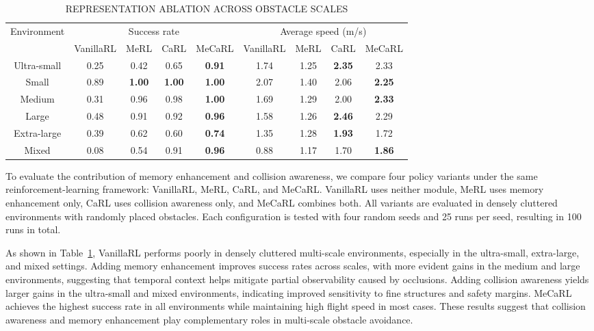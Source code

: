 \documentclass[letterpaper, 10 pt, conference]{ieeeconf}  %
\begin{document}
\begin{table}[t]
  \centering
  \caption{REPRESENTATION ABLATION ACROSS OBSTACLE SCALES}
  \label{tab:repr_eval}
  \small
  \setlength{\tabcolsep}{5pt}
  \renewcommand{\arraystretch}{1.15}
  \begin{tabular}{c cccc cccc}
    \toprule
    \multirow{2}{*}{Environment} &
    \multicolumn{4}{c}{Success rate} &
    \multicolumn{4}{c}{Average speed (m/s)} \\
    \cmidrule(lr){2-5}\cmidrule(lr){6-9}
    & VanillaRL & MeRL & CaRL & MeCaRL
    & VanillaRL & MeRL & CaRL & MeCaRL \\
    \midrule
    Ultra-small & 0.25 & 0.42 & 0.65 & \textbf{0.91} & 1.74 & 1.25 & \textbf{2.35} & 2.33 \\
    Small       & 0.89 & \textbf{1.00} & \textbf{1.00} & \textbf{1.00} & 2.07 & 1.40 & 2.06 & \textbf{2.25} \\
    Medium      & 0.31 & 0.96 & 0.98 & \textbf{1.00} & 1.69 & 1.29 & 2.00 & \textbf{2.33} \\
    Large       & 0.48 & 0.91 & 0.92 & \textbf{0.96} & 1.58 & 1.26 & \textbf{2.46} & 2.29 \\
    Extra-large & 0.39 & 0.62 & 0.60 & \textbf{0.74} & 1.35 & 1.28 & \textbf{1.93} & 1.72 \\
    Mixed       & 0.08 & 0.54 & 0.91 & \textbf{0.96} & 0.88 & 1.17 & 1.70 & \textbf{1.86} \\
    \bottomrule
  \end{tabular}
\end{table}

To evaluate the contribution of memory enhancement and collision awareness, we compare four policy variants under the same reinforcement-learning framework: VanillaRL, MeRL, CaRL, and MeCaRL. 
VanillaRL uses neither module, MeRL uses memory enhancement only, CaRL uses collision awareness only, and MeCaRL combines both. 
All variants are evaluated in densely cluttered environments with randomly placed obstacles. Each configuration is tested with four random seeds and 25 runs per seed, resulting in 100 runs in total.

As shown in Table~\ref{tab:repr_eval}, VanillaRL performs poorly in densely cluttered multi-scale environments, especially in the ultra-small, extra-large, and mixed settings. 
Adding memory enhancement improves success rates across scales, with more evident gains in the medium and large environments, suggesting that temporal context helps mitigate partial observability caused by occlusions. 
Adding collision awareness yields larger gains in the ultra-small and mixed environments, indicating improved sensitivity to fine structures and safety margins. 
MeCaRL achieves the highest success rate in all environments while maintaining high flight speed in most cases. 
These results suggest that collision awareness and memory enhancement play complementary roles in multi-scale obstacle avoidance.
\end{document}
